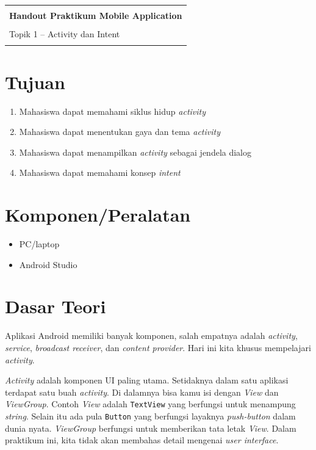 \documentclass{scrartcl}
\begin{document}
\begin{center}
\begin{tabu} to \linewidth {X[c]}
	\toprule
	\\
	\LARGE{\textbf{Handout Praktikum Mobile Application}} \\
	\\
	\large{Topik 1 -- Activity dan Intent} \\
	\\
	\bottomrule
\end{tabu}
\end{center}

\tableofcontents


\section{Tujuan}
\begin{enumerate}
	\item Mahasiswa dapat memahami siklus hidup \textit{activity}
	\item Mahasiswa dapat menentukan gaya dan tema \textit{activity}
	\item Mahasiswa dapat menampilkan \textit{activity} sebagai jendela dialog
	\item Mahasiswa dapat memahami konsep \textit{intent}
\end{enumerate}

\section{Komponen/Peralatan}
\begin{itemize}
	\item PC/laptop
	\item Android Studio
\end{itemize}

\section{Dasar Teori}

Aplikasi Android memiliki banyak komponen, salah empatnya adalah \textit{activity}, \textit{service}, \textit{broadcast receiver}, dan \textit{content provider}. Hari ini kita khusus mempelajari \textit{activity}.

\textit{Activity} adalah komponen UI paling utama. Setidaknya dalam satu aplikasi terdapat satu buah \textit{activity}. Di dalamnya bisa kamu isi dengan \textit{View} dan \textit{ViewGroup}. Contoh \textit{View} adalah \texttt{TextView} yang berfungsi untuk menampung \textit{string}. Selain itu ada pula \texttt{Button} yang berfungsi layaknya \textit{push-button} dalam dunia nyata. \textit{ViewGroup} berfungsi untuk memberikan tata letak \textit{View}. Dalam praktikum ini, kita tidak akan membahas detail mengenai \textit{user interface}.
\end{document}
